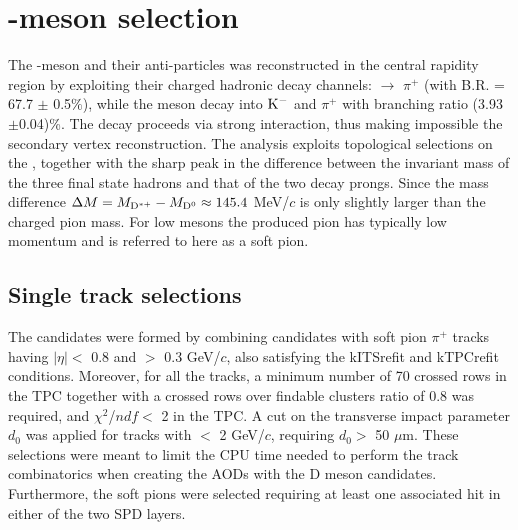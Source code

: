 \section{\Dstar -meson selection}
The \Dstar -meson and their anti-particles was reconstructed in the central rapidity region by exploiting their charged hadronic decay channels: \Dstar $\rightarrow$ \Dzero$\pi^{+}$ (with B.R. = 67.7 $\pm$ 0.5$\%$), while the \Dzero meson decay into $\rm K^-$ and $\pi^{+}$ with branching ratio (3.93$\pm$0.04)\%. The \Dstar decay proceeds via strong interaction, thus making impossible the secondary vertex reconstruction. The analysis exploits topological selections on the \Dzero,  together with the sharp peak in the difference between the invariant mass of the three final state hadrons and that of the two \Dzero decay prongs. Since the mass difference $\Delta M = M_{\rm D^{\ast +}} - M_{\rm D^0} \approx 145.4$ MeV/$c$ is only slightly larger than the charged pion mass. For low \pt \Dstar mesons the produced pion has typically low momentum and is referred to here as a soft pion.



\subsection{Single track selections}
\label{sec:single_track}

The \Dstar candidates were formed by combining \Dzero candidates with soft pion $\pi^{+}$ tracks having $|\eta| <$ 0.8 and \pt $>$ 0.3 GeV/$c$, also satisfying the kITSrefit and kTPCrefit conditions. Moreover, for all the tracks, a minimum number of 70 crossed rows in the TPC together with a crossed rows over findable clusters ratio of 0.8 was required, and $\chi^2$/$ndf <$ 2 in the TPC. A cut on the transverse impact parameter $d_0$ was applied for tracks with \pt $<$ 2 GeV/$c$, requiring $d_0 >$ 50 $\mu$m. These selections were meant to limit the CPU time needed to perform the track combinatorics when creating the AODs with the D meson candidates. Furthermore, the \Dstar soft pions were selected requiring at least one associated hit in either of the two SPD layers.


